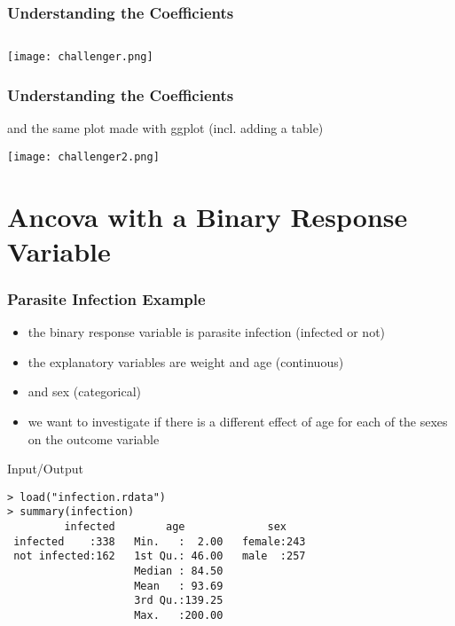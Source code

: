 \begin{frame}[fragile]\frametitle{Understanding the Coefficients}\footnotesize
\begin{verbatim}

\end{verbatim}
\begin{center}
\texttt{[image: challenger.png]}
\end{center}
\end{frame}

\begin{frame}[fragile]\frametitle{Understanding the Coefficients}
and the same plot made with ggplot (incl. adding a table)
\begin{center}
\texttt{[image: challenger2.png]}
\end{center}
\end{frame}


\section[Binomial Ancova]{Ancova with a Binary Response Variable }

\begin{frame}[fragile]\frametitle{Parasite Infection Example}
\begin{itemize}
\item the binary response variable is parasite infection (infected or not) 
\item the explanatory variables are weight and age (continuous) 
\item and sex (categorical)
\item we want to investigate if there is a different effect of age for each of the sexes on the outcome variable
\end{itemize}
\begin{exampleblock}{Input/Output}\footnotesize
\begin{verbatim}
> load("infection.rdata")
> summary(infection)
         infected        age             sex     
 infected    :338   Min.   :  2.00   female:243  
 not infected:162   1st Qu.: 46.00   male  :257  
                    Median : 84.50               
                    Mean   : 93.69               
                    3rd Qu.:139.25               
                    Max.   :200.00               
\end{verbatim}
\end{exampleblock}

\end{frame}


